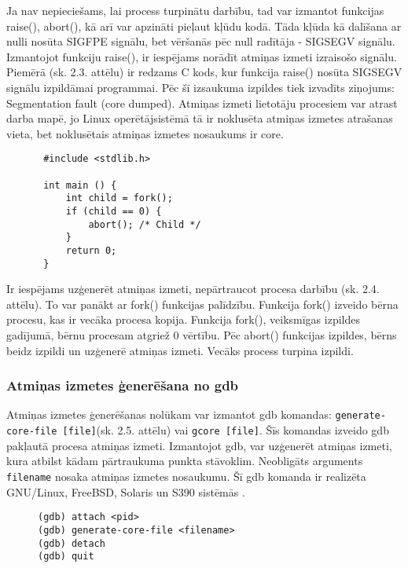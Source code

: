 Ja nav nepieciešams, lai process turpinātu darbību, tad var izmantot funkcijas raise(), abort(), kā arī var apzināti pieļaut kļūdu kodā.
Tāda kļūda kā dalīšana ar nulli nosūta SIGFPE signālu, bet vēršanās pēc null radītāja - SIGSEGV signālu.
Izmantojot funkciju raise(), ir iespējams norādīt atmiņas izmeti izraisošo signālu.
Piemērā (sk. 2.3. attēlu) ir redzams C kods, kur funkcija raise() nosūta SIGSEGV signālu izpildāmai programmai. 
Pēc šī izsaukuma izpildes tiek izvadīts ziņojums: Segmentation fault (core dumped).
Atmiņas izmeti lietotāju procesiem var atrast darba mapē, jo Linux operētājsistēmā tā ir noklusēta atmiņas izmetes atrašanas vieta, bet noklusētais atmiņas izmetes nosaukums ir core.
\begin{figure}[h]
\begin{lstlisting}
 #include <stdlib.h>

 int main () {
     int child = fork();
     if (child == 0) {
         abort(); /* Child */
     }
     return 0;
 }
 \end{lstlisting}
\caption{\textbf{\fontsize{11}{12}\selectfont {Atmiņas izmetes ģenerēšana, turpinot procesa darbību}}}
\end{figure}

Ir iespējams uzģenerēt atmiņas izmeti, nepārtraucot procesa darbību (sk. 2.4. attēlu). 
To var panākt ar fork() funkcijas palīdzību. Funkcija fork() izveido bērna procesu, kas ir vecāka procesa kopija.
Funkcija fork(), veiksmīgas izpildes gadījumā, bērnu procesam atgriež 0 vērtību. 
Pēc abort() funkcijas izpildes, bērns beidz izpildi un uzģenerē atmiņas izmeti. Vecāks process turpina izpildi.




\subsubsection{Atmiņas izmetes ģenerēšana no gdb}

Atmiņas izmetes ģenerēšanas nolūkam var izmantot gdb komandas: \texttt{generate-core-file [file]}(sk. 2.5. attēlu) vai \texttt{gcore [file]}. Šīs komandas izveido gdb pakļautā procesa atmiņas izmeti. 
Izmantojot gdb, var uzģenerēt atmiņas izmeti, kura atbilst kādam pārtraukuma punkta stāvoklim. 
Neobligāts arguments \texttt{filename} nosaka atmiņas izmetes nosaukumu. Šī gdb komanda ir realizēta GNU/Linux, FreeBSD, Solaris un S390 sistēmās \cite {gdb_gen_core}.
\begin{figure}[h]
\begin{lstlisting}[style=customgdb]
(gdb) attach <pid>
(gdb) generate-core-file <filename>
(gdb) detach
(gdb) quit
 \end{lstlisting}
\caption{\textbf{\fontsize{11}{12}\selectfont {Atmiņas izmetes ģenerēšana, izmantojot gdb}}}
\end{figure}


